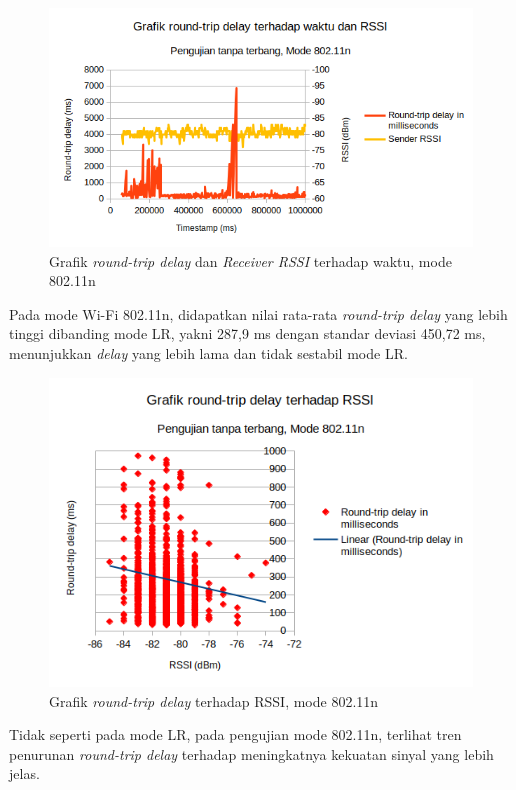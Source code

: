 \begin{figure}[H]
	\centering
	\includegraphics[scale=0.7]{./assets/Graphs/NoFly_11N/Delay-Time}
	\caption{Grafik \textit{round-trip delay} dan \textit{Receiver RSSI} terhadap waktu, mode 802.11n}
\end{figure}
Pada mode Wi-Fi 802.11n, didapatkan nilai rata-rata \textit{round-trip delay} yang lebih tinggi dibanding mode LR, yakni 287,9 ms dengan standar deviasi 450,72 ms, menunjukkan \textit{delay} yang lebih lama dan tidak sestabil mode LR.
\begin{figure}[H]
	\centering
	\includegraphics[scale=0.7]{./assets/Graphs/NoFly_11N/Delay-RSSI}
	\caption{Grafik \textit{round-trip delay} terhadap RSSI, mode 802.11n}
\end{figure}
Tidak seperti pada mode LR, pada pengujian mode 802.11n, terlihat tren penurunan \textit{round-trip delay} terhadap meningkatnya kekuatan sinyal yang lebih jelas.
